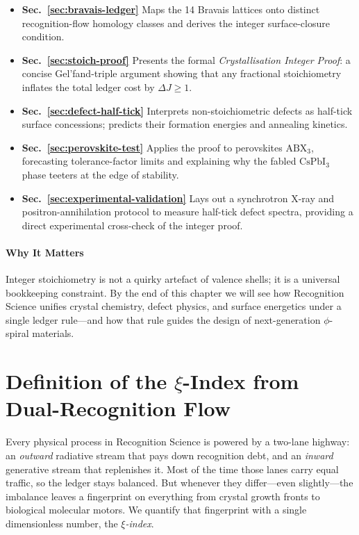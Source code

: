 \documentclass[11pt,oneside]{book}
\begin{document}
\begin{itemize}
  \item \textbf{Sec.~\ref{sec:bravais-ledger}}  
        Maps the 14 Bravais lattices onto distinct recognition-flow
        homology classes and derives the integer surface-closure
        condition.
  \item \textbf{Sec.~\ref{sec:stoich-proof}}  
        Presents the formal \emph{Crystallisation Integer Proof}:
        a concise Gel’fand-triple argument showing that any fractional
        stoichiometry inflates the total ledger cost by
        \(\Delta J \ge 1\).
  \item \textbf{Sec.~\ref{sec:defect-half-tick}}  
        Interprets non-stoichiometric defects as half-tick surface
        concessions; predicts their formation energies and annealing
        kinetics.
  \item \textbf{Sec.~\ref{sec:perovskite-test}}  
        Applies the proof to perovskites
        \(\mathrm{ABX_3}\), forecasting tolerance-factor limits and
        explaining why the fabled \(\mathrm{CsPbI_3}\) phase teeters at
        the edge of stability.
  \item \textbf{Sec.~\ref{sec:experimental-validation}}  
        Lays out a synchrotron X-ray and positron-annihilation protocol
        to measure half-tick defect spectra, providing a direct
        experimental cross-check of the integer proof.
\end{itemize}

\paragraph*{Why It Matters}

Integer stoichiometry is not a quirky artefact of valence shells; it is a
universal bookkeeping constraint.  
By the end of this chapter we will see how Recognition Science unifies
crystal chemistry, defect physics, and surface energetics under a single
ledger rule—and how that rule guides the design of next-generation
\(\phi\)-spiral materials.

\bigskip

\section{Definition of the \texorpdfstring{$\xi$}{ξ}-Index from Dual-Recognition Flow}
\label{sec:xi-index}



Every physical process in Recognition Science is powered by a
two-lane highway: an \textit{outward} radiative stream that pays down
recognition debt, and an \textit{inward} generative stream that replenishes it.
Most of the time those lanes carry equal traffic, so the ledger stays
balanced.  
But whenever they differ—even slightly—the imbalance leaves a
fingerprint on everything from crystal growth fronts to biological
molecular motors.  
We quantify that fingerprint with a single dimensionless number, the
\emph{\(\xi\)-index}.
\end{document}
